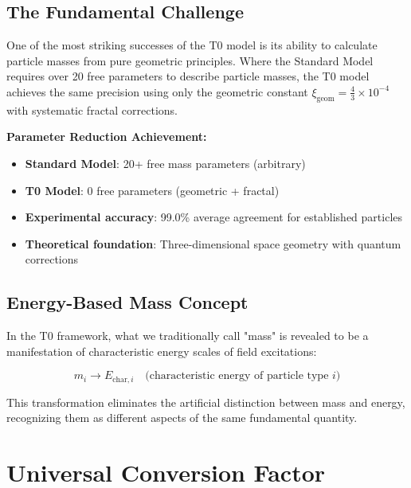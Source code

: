 \documentclass[12pt,a4paper]{article}
\newcommand{\xigeom}{\xi_{\text{geom}}}
\begin{document}
	\subsection{The Fundamental Challenge}
	\label{subsec:fundamental_challenge}
	
	One of the most striking successes of the T0 model is its ability to calculate particle masses from pure geometric principles. Where the Standard Model requires over 20 free parameters to describe particle masses, the T0 model achieves the same precision using only the geometric constant $\xigeom = \frac{4}{3} \times 10^{-4}$ with systematic fractal corrections.
	
	\begin{tcolorbox}[colback=green!5!white,colframe=green!75!black,title=Mass Revolution]
		\textbf{Parameter Reduction Achievement:}
		\begin{itemize}
			\item \textbf{Standard Model}: 20+ free mass parameters (arbitrary)
			\item \textbf{T0 Model}: 0 free parameters (geometric + fractal)
			\item \textbf{Experimental accuracy}: 99.0\% average agreement for established particles
			\item \textbf{Theoretical foundation}: Three-dimensional space geometry with quantum corrections
		\end{itemize}
	\end{tcolorbox}
	
	\subsection{Energy-Based Mass Concept}
	\label{subsec:energy_based_mass}
	
	In the T0 framework, what we traditionally call "mass" is revealed to be a manifestation of characteristic energy scales of field excitations:
	
	\begin{equation}
		\boxed{m_i \rightarrow E_{\text{char},i} \quad \text{(characteristic energy of particle type } i\text{)}}
		\label{eq:mass_to_energy}
	\end{equation}
	
	This transformation eliminates the artificial distinction between mass and energy, recognizing them as different aspects of the same fundamental quantity.
	
	\section{Universal Conversion Factor}
	\label{sec:universal_conversion_factor}
	
\end{document}
